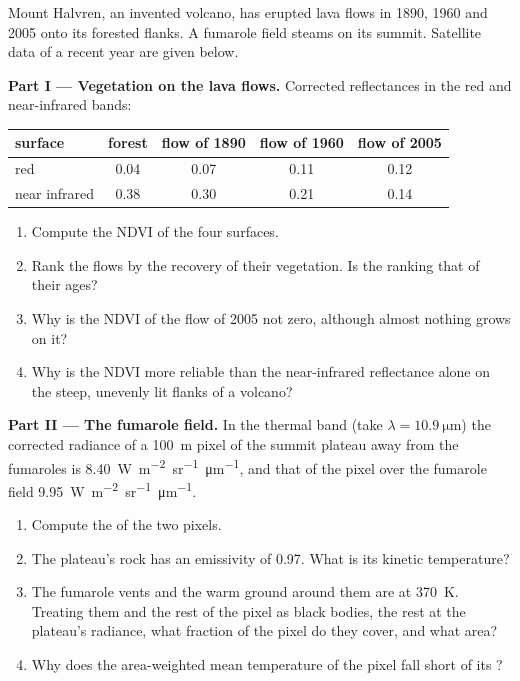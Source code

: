 \begin{problem}
\label{pb:b3:remote-sensing-gis:1}
Mount Halvren, an invented volcano, has erupted lava flows in 1890, 1960
and 2005 onto its forested flanks. A fumarole field steams on its summit.
Satellite data of a recent year are given below.

\medskip\noindent\textbf{Part I --- Vegetation on the lava flows.} Corrected
reflectances in the red and near-infrared bands:
\begin{center}
\small
\begin{tabular}{lcccc}
\hline
surface & forest & flow of 1890 & flow of 1960 & flow of 2005 \\
\hline
red & 0.04 & 0.07 & 0.11 & 0.12 \\
near infrared & 0.38 & 0.30 & 0.21 & 0.14 \\
\hline
\end{tabular}
\end{center}
\begin{enumerate}
\item Compute the NDVI of the four surfaces.
\item Rank the flows by the recovery of their vegetation. Is the ranking
  that of their ages?
\item Why is the NDVI of the flow of 2005 not zero, although almost
  nothing grows on it?
\item Why is the NDVI more reliable than the near-infrared reflectance
  alone on the steep, unevenly lit flanks of a volcano?
\end{enumerate}

\medskip\noindent\textbf{Part II --- The fumarole field.} In the thermal
band (take $\lambda = \qty{10.9}{\micro\metre}$) the corrected radiance of
a \qty{100}{m} pixel of the summit plateau away from the fumaroles is
\qty{8.40}{W.m^{-2}.sr^{-1}.\micro\metre^{-1}}, and that of the pixel over
the fumarole field \qty{9.95}{W.m^{-2}.sr^{-1}.\micro\metre^{-1}}.
\begin{enumerate}[resume]
\item Compute the  of the two pixels.
\item The plateau's rock has an emissivity of 0.97. What is its kinetic
  temperature?
\item The fumarole vents and the warm ground around them are at
  \qty{370}{K}. Treating them and the rest of the pixel as black bodies,
  the rest at the plateau's radiance, what fraction of the pixel do they
  cover, and what area?
\item Why does the area-weighted mean temperature of the pixel fall short
  of its ?
\end{enumerate}


\end{problem}
